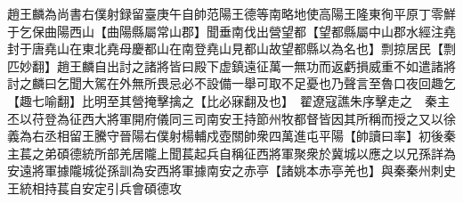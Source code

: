 趙王麟為尚書右僕射録留臺庚午自帥范陽王德等南略地使高陽王隆東徇平原丁零鮮于乞保曲陽西山【曲陽縣屬常山郡】聞垂南伐出營望都【望都縣屬中山郡水經注堯封于唐堯山在東北堯母慶都山在南登堯山見都山故望都縣以為名也】剽掠居民【剽匹妙翻】趙王麟自出討之諸將皆曰殿下虚鎮遠征萬一無功而返虧損威重不如遣諸將討之麟曰乞聞大駕在外無所畏忌必不設備一舉可取不足憂也乃聲言至魯口夜回趣乞【趣七喻翻】比明至其營掩擊擒之【比必寐翻及也】　翟遼寇譙朱序擊走之　秦主丕以苻登為征西大將軍開府儀同三司南安王持節州牧都督皆因其所稱而授之又以徐義為右丞相留王騰守晉陽右僕射楊輔戍壺關帥衆四萬進屯平陽【帥讀曰率】初後秦主萇之弟碩德統所部羌居隴上聞萇起兵自稱征西將軍聚衆於冀城以應之以兄孫詳為安遠將軍據隴城從孫訓為安西將軍據南安之赤亭【諸姚本赤亭羌也】與秦秦州刺史王統相持萇自安定引兵會碩德攻